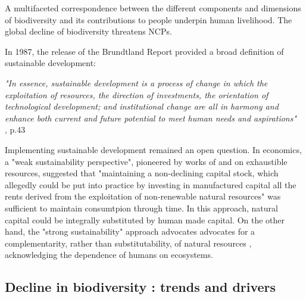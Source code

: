 A multifaceted correspondence between the different components and dimensions of biodiversity and its contributions to people underpin human livelihood. The global decline of biodiversity threatens NCPs.

\clearpage
\begin{tcolorbox}[breakable, 
colback=verylightgray, 
colframe=gray!75!black, 
title= {Box 1 - Weak v. Strong Sustainability},
fontupper=\small]
\par %
\justifying %

In 1987, the release of the Brundtland Report \citep{brundtland} provided a broad definition of sustainable development: 

\begin{displayquote}
\textit{"In essence, sustainable development is a process of change in which the exploitation of
resources, the direction of investments, the orientation of technological development; and institutional change are all in harmony and enhance both current and future potential to meet human needs and aspirations"}\\
\hspace*{\fill}\small{\cite{brundtland}, p.43}
\end{displayquote}

Implementing sustainable development remained an open question. In economics, a "weak sustainability perspective", pioneered by works of \cite{hartwick_intergenerational_1977} and \cite{solow_intergenerational_1986} on exhaustible resources, suggested that "maintaining a non-declining capital stock, which allegedly could be put into practice by investing in manufactured capital all the rents derived from the exploitation of non-renewable natural resources" \citep{gomez_history_2010} was sufficient to maintain consumtpion through time. In this approach, natural capital could be integrally substituted by human made capital. On the other hand, the "strong sustainability" approach advocates advocates for a complementarity, rather than substitutability, of natural resources \citep{costanza_daly}, acknowledging the dependence of humans on ecosystems.
\end{tcolorbox}

{}
\subsection*{Decline in biodiversity : trends and drivers}

